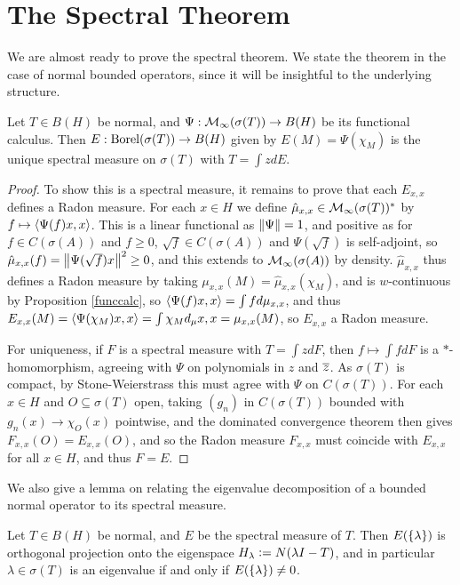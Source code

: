 \documentclass[10pt]{amsart}
\begin{document}
\section{The Spectral Theorem}
We are almost ready to prove the spectral theorem. We state %
 the theorem in the case of normal bounded operators, since it will be insightful to the underlying structure.
\begin{theorem}\label{specnorm}
    Let $T \in B(H)$ be normal, and $\Psi : \mathcal{M}_\infty(\sigma(T)) \to B(H)$ be its functional calculus. Then $E : \operatorname{Borel}(\sigma(T)) \to B(H)$ given by $E(M) = \Psi(\chi_M)$ is the unique spectral measure on $\sigma(T)$ with $T = \int z dE$.
\end{theorem}
\begin{proof}
    To show this is a spectral measure, it remains to prove that each $E_{x, x}$ defines a Radon measure. For each $x \in H$ we define $\hat\mu_{x, x} \in \mathcal{M}_\infty(\sigma(T))^*$ by $f \mapsto \left\langle \Psi(f)x, x \right\rangle$. This is a linear functional as $\left\| \Psi \right\| = 1$, and positive as for $f \in C(\sigma(A))$ and $f \geq 0$, $\sqrt{f} \in C(\sigma(A))$ and $\Psi(\sqrt{f})$ is self-adjoint, so $\hat\mu_{x, x}(f) = \left\| \Psi(\sqrt{f})x \right\|^2 \geq 0$, and this extends to $\mathcal{M}_\infty(\sigma(A))$ by density. $\hat\mu_{x, x}$ thus defines a Radon measure by taking $\mu_{x, x}(M) = \hat\mu_{x, x}(\chi_M)$, and is $w$-continuous by Proposition \ref{funccalc}, so $\left\langle \Psi(f)x, x \right\rangle = \int f d\mu_{x, x}$, and thus $E_{x, x}(M) = \left\langle \Psi(\chi_M)x, x \right\rangle = \int \chi_M d_\mu{x, x} = \mu_{x, x}(M)$, so $E_{x, x}$ a Radon measure.

    For uniqueness, if $F$ is a spectral measure with $T = \int z dF$, then $f \mapsto \int f dF$ is a $*$-homomorphism, agreeing with $\Psi$ on polynomials in $z$ and $\overline{z}$. As $\sigma(T)$ is compact, by Stone-Weierstrass this must agree with $\Psi$ on $C(\sigma(T))$. For each $x \in H$ and $O \subseteq \sigma(T)$ open, taking $(g_n)$ in $C(\sigma(T))$ bounded with $g_n(x) \to \chi_O(x)$ pointwise, and the dominated convergence theorem then gives $F_{x, x}(O) = E_{x, x}(O)$, and so the Radon measure $F_{x, x}$ must coincide with $E_{x, x}$ for all $x \in H$, and thus $F = E$.
\end{proof}
We also give a lemma on relating the eigenvalue decomposition of a bounded normal operator to its spectral measure.
\begin{lemma}\label{bdnormaleigen}
    Let $T \in B(H)$ be normal, and $E$ be the spectral measure of $T$. Then $E(\left\{  \lambda  \right\})$ is orthogonal projection onto the eigenspace $H_\lambda \vcentcolon= N(\lambda I - T)$, and in particular $\lambda \in \sigma(T)$ is an eigenvalue if and only if $E(\left\{  \lambda  \right\}) \neq 0$.
\end{lemma}
\end{document}
